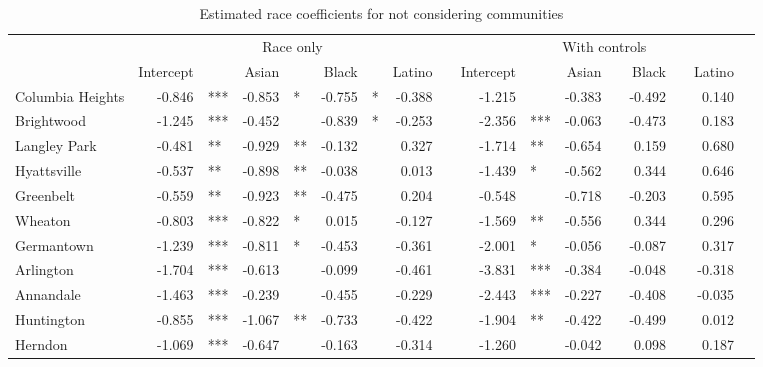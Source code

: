 % 
\begin{sidewaystable}[ht]
\centering
\caption{Estimated race coefficients for not considering communities} 
\label{tab:notconsider}
\begin{tabular}{lrlrlrlrlrlrlrlrl}
  \toprule
  & \multicolumn{8}{c}{Race only} & \multicolumn{8}{c}{With controls}\\
 & Intercept && Asian && Black && Latino&& Intercept && Asian && Black && Latino&\\
 \midrule
Columbia Heights & -0.846 & *** & -0.853 & * & -0.755 & * & -0.388 &  & -1.215 &  & -0.383 &  & -0.492 &  & 0.140 &  \\ 
  Brightwood & -1.245 & *** & -0.452 &  & -0.839 & * & -0.253 &  & -2.356 & *** & -0.063 &  & -0.473 &  & 0.183 &  \\ 
  Langley Park & -0.481 & ** & -0.929 & ** & -0.132 &  & 0.327 &  & -1.714 & ** & -0.654 &  & 0.159 &  & 0.680 &  \\ 
  Hyattsville & -0.537 & ** & -0.898 & ** & -0.038 &  & 0.013 &  & -1.439 & * & -0.562 &  & 0.344 &  & 0.646 &  \\ 
  Greenbelt & -0.559 & ** & -0.923 & ** & -0.475 &  & 0.204 &  & -0.548 &  & -0.718 &  & -0.203 &  & 0.595 &  \\ 
  Wheaton & -0.803 & *** & -0.822 & * & 0.015 &  & -0.127 &  & -1.569 & ** & -0.556 &  & 0.344 &  & 0.296 &  \\ 
  Germantown & -1.239 & *** & -0.811 & * & -0.453 &  & -0.361 &  & -2.001 & * & -0.056 &  & -0.087 &  & 0.317 &  \\ 
  Arlington & -1.704 & *** & -0.613 &  & -0.099 &  & -0.461 &  & -3.831 & *** & -0.384 &  & -0.048 &  & -0.318 &  \\ 
  Annandale & -1.463 & *** & -0.239 &  & -0.455 &  & -0.229 &  & -2.443 & *** & -0.227 &  & -0.408 &  & -0.035 &  \\ 
  Huntington & -0.855 & *** & -1.067 & ** & -0.733 &  & -0.422 &  & -1.904 & ** & -0.422 &  & -0.499 &  & 0.012 &  \\ 
  Herndon & -1.069 & *** & -0.647 &  & -0.163 &  & -0.314 &  & -1.260 &  & -0.042 &  & 0.098 &  & 0.187 &  \\ 
   \bottomrule
\end{tabular}
\end{sidewaystable}
